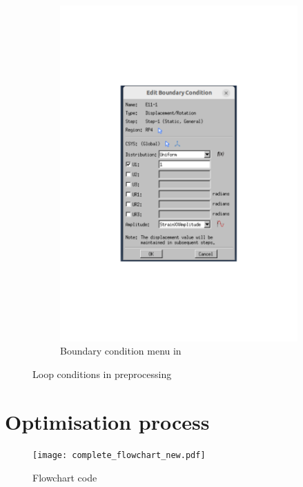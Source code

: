 \begin{figure}[H]
\begin{subfigure}[t]{0.35\textwidth}
        \includegraphics[width=\linewidth]{BC.pdf}
        \caption{Boundary condition menu in }
        \label{fig:bcmenu}
    \end{subfigure}

    \caption{Loop conditions in preprocessing}
    \label{fig:abaqus_settings}
\end{figure}

\section{Optimisation process} \label{sec: optimisationCode}

\begin{figure}[H]
    \texttt{[image: complete\_flowchart\_new.pdf]}
    \caption{Flowchart code}
    \label{fig: flowchart}
\end{figure}

